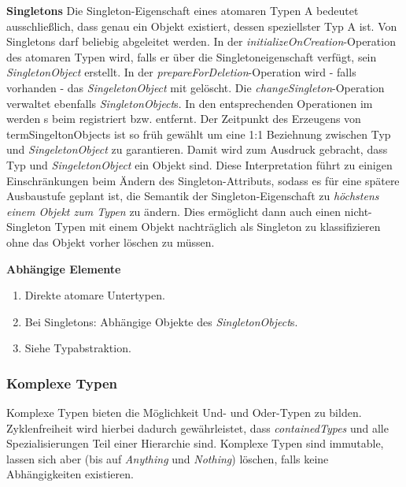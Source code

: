 \textbf{Singletons} \newline
Die Singleton-Eigenschaft eines atomaren Typen A bedeutet ausschließlich, dass genau ein Objekt existiert, dessen speziellster Typ A ist.
Von Singletons darf beliebig abgeleitet werden. 
In der \emph{initializeOnCreation}-Operation des atomaren Typen wird, falls er über die Singletoneigenschaft verfügt, 
sein \emph{SingletonObject} erstellt. In der \emph{prepareForDeletion}-Operation wird - falls vorhanden - das \emph{SingeletonObject}
mit gelöscht. Die \emph{changeSingleton}-Operation verwaltet ebenfalls \emph{SingletonObject}s. In den entsprechenden Operationen im 
 werden s beim  registriert bzw. entfernt.
Der Zeitpunkt des Erzeugens von term{SingeltonObject}s ist so früh gewählt um eine 1:1 Beziehnung zwischen Typ und \emph{SingeletonObject} zu garantieren.
Damit wird zum Ausdruck gebracht, dass Typ und \emph{SingeletonObject} ein Objekt sind. Diese Interpretation führt zu einigen Einschränkungen beim Ändern des Singleton-Attributs, 
sodass es für eine spätere Ausbaustufe geplant ist, die Semantik der Singleton-Eigenschaft zu \emph{höchstens einem Objekt zum Typen} zu ändern. Dies ermöglicht dann 
auch einen nicht-Singleton Typen mit einem Objekt nachträglich als Singleton zu klassifizieren ohne das Objekt vorher löschen zu müssen.  
 
\newpage
\textbf{Abhängige Elemente}
\begin{enumerate}
  		\item Direkte atomare Untertypen.
  		\item Bei Singletons: Abhängige Objekte des \emph{SingletonObject}s.
  		\item Siehe Typabstraktion.
\end{enumerate}

\subsubsection{Komplexe Typen}

Komplexe Typen bieten die Möglichkeit Und- und Oder-Typen zu bilden. Zyklenfreiheit wird hierbei dadurch gewährleistet, 
dass \emph{containedTypes} und alle Spezialisierungen Teil einer Hierarchie sind. Komplexe Typen sind immutable,
lassen sich aber (bis auf \emph{Anything} und \emph{Nothing}) löschen, falls keine Abhängigkeiten existieren.


